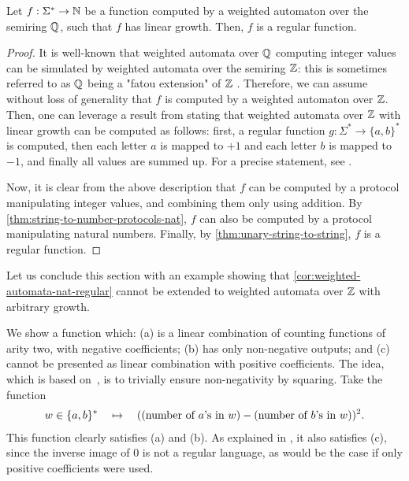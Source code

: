 \begin{corollary}
  \label{cor:weighted-automata-nat-regular}
  Let $f : \Sigma^* \to {\mathbb N}$ be a function computed by a weighted automaton
  over the semiring ${\mathbb Q}$, such that $f$ has linear growth. Then, $f$ is a regular function.
\end{corollary}
\begin{proof}
  It is well-known that weighted automata over ${\mathbb Q}$ computing integer values
  can be simulated by weighted automata over the semiring ${\mathbb Z}$: this is
  sometimes referred to as ${\mathbb Q}$ being a "fatou extension" of ${\mathbb Z}$
  \cite[p. 110]{BerstelReutenauer08}.
  Therefore, we can assume without loss of generality that $f$ is computed by
  a weighted automaton over ${\mathbb Z}$. Then, one can leverage a 
  result from \cite{Zpolyreg23} stating that weighted automata over ${\mathbb Z}$
  with linear growth can be computed as follows: first, a regular function $g : \Sigma^* \to
  \{a,b\}^*$ is computed, then each letter $a$ is mapped to $+1$ and each 
  letter $b$ is mapped to $-1$, and finally all values are summed up. 
  For a precise statement, see \cite[Proposition II.13, Theorem III.3]{Zpolyreg23}.

  Now, it is clear from the above description that $f$ can be computed by a protocol
  manipulating integer values, and combining them only using addition. By
  \cref{thm:string-to-number-protocols-nat}, $f$ can also be computed by a
  protocol manipulating natural numbers. Finally, by \cref{thm:unary-string-to-string},
  $f$ is a regular function.
\end{proof}

Let us conclude this section with an example showing that
\cref{cor:weighted-automata-nat-regular} cannot be extended to weighted
automata over ${\mathbb Z}$ with arbitrary growth.

\begin{myexample}\label{ex:quadratic-counterexample}
     We show  a function which: (a) is a linear combination of \mso  counting functions of arity two, with negative coefficients; (b) has only non-negative outputs; and (c) cannot be presented as linear combination with positive coefficients. The idea, which is based on~\cite[Example 2.1]{BerstelReutenauer08}, is to trivially ensure non-negativity by squaring. Take the function
\begin{align*}
w \in \{a,b\}^* 
\quad \mapsto \quad 
(\text{(number of $a$'s in $w$)} - \text{(number of $b$'s in $w$)})^2.
\end{align*}
This function clearly satisfies (a) and (b). As explained in \cite[p.3]{Zpolyreg23}, it also satisfies (c), since the inverse image of $0$ is not a regular language, as would be the case if only positive coefficients were used.
\end{myexample}
